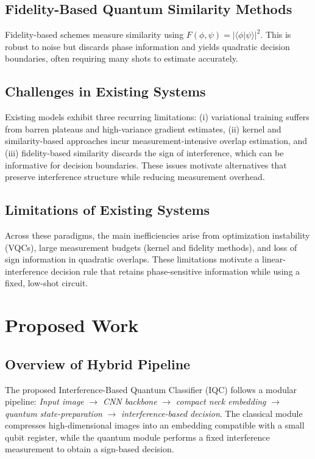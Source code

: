 \documentclass[conference]{IEEEtran}
\begin{document}
\subsection{Fidelity-Based Quantum Similarity Methods}
Fidelity-based schemes measure similarity using $F(\phi, \psi) = |\langle \phi | \psi \rangle|^2$. This is robust to noise but discards phase information and yields quadratic decision boundaries, often requiring many shots to estimate accurately.

\subsection{Challenges in Existing Systems}
Existing models exhibit three recurring limitations: (i) variational training suffers from barren plateaus and high-variance gradient estimates, (ii) kernel and similarity-based approaches incur measurement-intensive overlap estimation, and (iii) fidelity-based similarity discards the sign of interference, which can be informative for decision boundaries. These issues motivate alternatives that preserve interference structure while reducing measurement overhead.

\subsection{Limitations of Existing Systems}
Across these paradigms, the main inefficiencies arise from optimization instability (VQCs), large measurement budgets (kernel and fidelity methods), and loss of sign information in quadratic overlaps. These limitations motivate a linear-interference decision rule that retains phase-sensitive information while using a fixed, low-shot circuit.

\section{Proposed Work}

\subsection{Overview of Hybrid Pipeline}
The proposed Interference-Based Quantum Classifier (IQC) follows a modular pipeline: \emph{Input image} $\rightarrow$ \emph{CNN backbone} $\rightarrow$ \emph{compact neck embedding} $\rightarrow$ \emph{quantum state-preparation} $\rightarrow$ \emph{interference-based decision}. The classical module compresses high-dimensional images into an embedding compatible with a small qubit register, while the quantum module performs a fixed interference measurement to obtain a sign-based decision.
\end{document}
